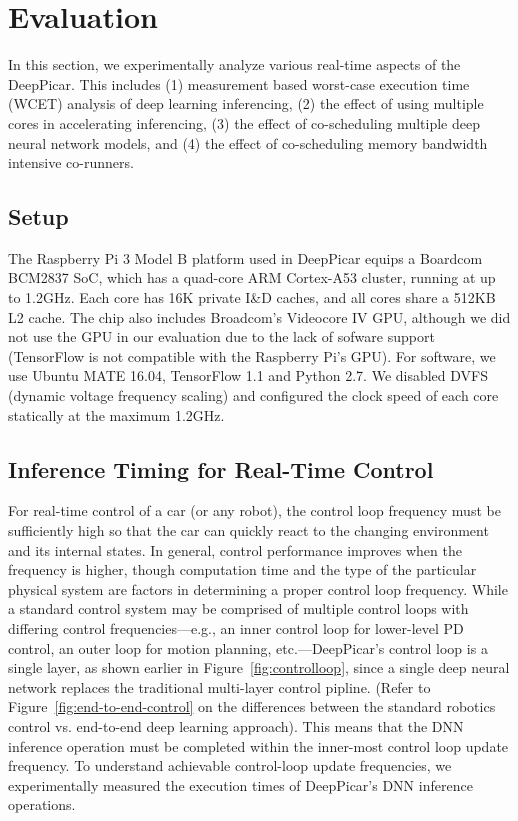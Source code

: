 
\section{Evaluation}\label{sec:evaluation}

In this section, we experimentally analyze various real-time aspects
of the DeepPicar. This includes
(1) measurement based worst-case execution time (WCET) analysis of
deep learning inferencing,
(2) the effect of using multiple cores in accelerating inferencing,
(3) the effect of co-scheduling multiple deep neural network models,
and 
(4) the effect of co-scheduling memory bandwidth intensive co-runners.

\subsection{Setup}

The Raspberry Pi 3 Model B platform used in DeepPicar equips a Boardcom
BCM2837 SoC, which has a quad-core ARM Cortex-A53 cluster,
running at up to 1.2GHz. Each core has 16K private I\&D caches, and all
cores share a 512KB L2 cache.
The chip also includes Broadcom's Videocore IV
GPU, although we did not use the GPU in our evaluation due to the lack
of sofware support (TensorFlow is not compatible with the Raspberry Pi's GPU).
For software, we use Ubuntu MATE 16.04, TensorFlow 1.1 and Python
2.7. We disabled DVFS (dynamic voltage frequency scaling) and
configured the clock speed of each core statically at the maximum 1.2GHz.

\subsection{Inference Timing for Real-Time Control}

For real-time control of a car (or any robot), the control loop
frequency must be sufficiently high so that the car can quickly
react to the changing environment and its internal states. In general,
control performance improves when the frequency is higher, though
computation time and the type of the particular physical system are
factors in determining a proper control loop frequency. While a standard
control system may be comprised of multiple control loops with
differing control frequencies---e.g., an inner control loop for lower-level
PD control, an outer loop for motion planning, etc.---DeepPicar's
control loop is a single layer, as shown earlier in
Figure~\ref{fig:controlloop}, since a single deep neural network
replaces the traditional multi-layer control pipline. (Refer to
Figure~\ref{fig:end-to-end-control} on the differences between the
standard robotics control vs. end-to-end deep learning approach).
This means that the DNN inference operation must be completed
within the inner-most control loop update frequency. To understand
achievable control-loop update frequencies, we experimentally measured
the execution times of DeepPicar's DNN inference operations.

